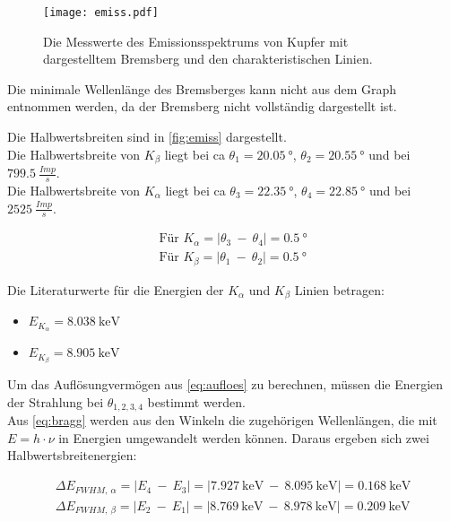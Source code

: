 \begin{figure}[htbp]
  \centering
  \texttt{[image: emiss.pdf]}
  \caption{Die Messwerte des Emissionsspektrums von Kupfer mit dargestelltem Bremsberg und den charakteristischen Linien.}
  \label{fig:emiss}
\end{figure}
Die minimale Wellenlänge des Bremsberges kann nicht aus dem Graph entnommen werden, da der Bremsberg nicht vollständig dargestellt ist.

Die Halbwertsbreiten sind in \autoref{fig:emiss} dargestellt.\\
Die Halbwertsbreite von $K_{\beta}$ liegt bei ca $\theta_1 = \SI{20.05}{\degree}$, $\theta_2 = \SI{20.55}{\degree}$ und bei $799.5\ \frac{Imp}{s}$.\\
Die Halbwertsbreite von $K_{\alpha}$ liegt bei ca $\theta_3 = \SI{22.35}{\degree}$, $\theta_4 = \SI{22.85}{\degree}$ und bei $2525\ \frac{Imp}{s}$.

\begin{align*}
  \text{Für } K_{\alpha} = \mid \theta_3\ -\ \theta_4 \mid = \SI{0.5}{\degree}\\
  \text{Für } K_{\beta} = \mid \theta_1\ -\ \theta_2 \mid = \SI{0.5}{\degree}
\end{align*}

Die Literaturwerte für die Energien der $K_{\alpha}$ und $K_{\beta}$ Linien betragen\cite{kline}:

\begin{itemize}
  \item $E_{K_{\alpha}} = \SI{8.038}{\kilo\electronvolt}$
  \item $E_{K_{\beta}} = \SI{8.905}{\kilo\electronvolt}$
\end{itemize}

Um das Auflösungvermögen aus \autoref{eq:aufloes} zu berechnen, müssen die Energien der Strahlung bei $\theta_{1,2,3,4}$ bestimmt werden.\\
Aus \autoref{eq:bragg} werden aus den Winkeln die zugehörigen Wellenlängen, die mit $E = h\cdot \nu$ in Energien umgewandelt werden können.
Daraus ergeben sich zwei Halbwertsbreitenergien:

\begin{align*}
  \Delta E_{FWHM,\ \alpha} = \mid E_4\ -\ E_3 \mid = \mid \SI{7.927}{\kilo\electronvolt}\ -\ \SI{8.095}{\kilo\electronvolt} \mid = \SI{0.168}{\kilo\electronvolt}\\
  \Delta E_{FWHM,\ \beta} = \mid E_2\ -\ E_1 \mid = \mid \SI{8.769}{\kilo\electronvolt}\ -\ \SI{8.978}{\kilo\electronvolt} \mid = \SI{0.209}{\kilo\electronvolt}
\end{align*}

